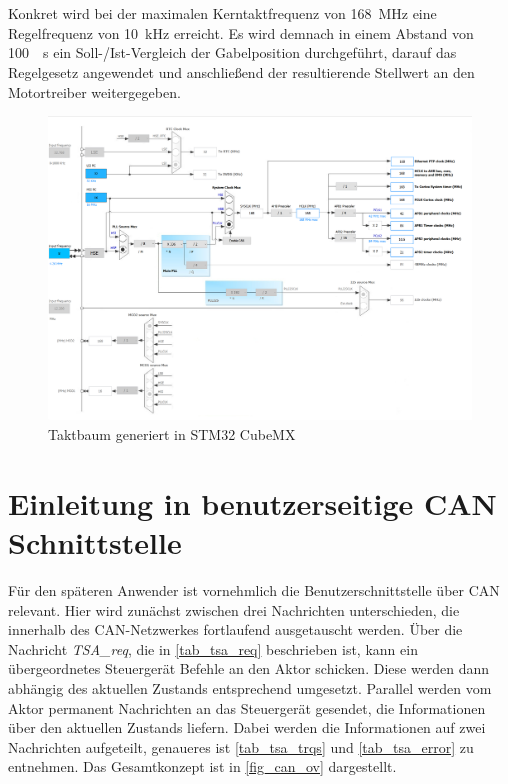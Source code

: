 \section{}
Konkret wird bei der maximalen Kerntaktfrequenz von \SI{168}{MHz} eine Regelfrequenz von \SI{10}{kHz} erreicht. Es wird demnach in einem Abstand von \SI{100}{\mu s} ein Soll-/Ist-Vergleich der Gabelposition durchgeführt, darauf das Regelgesetz angewendet und anschließend der resultierende Stellwert an den Motortreiber weitergegeben.

\begin{figure}%
\includegraphics[width=\columnwidth]{./Bilder/fig_clock}%
\caption{Taktbaum generiert in STM32 CubeMX}%
\label{fig_clock}%
\end{figure}

\section{Einleitung in benutzerseitige CAN Schnittstelle} \label{CANNachrichten}

Für den späteren Anwender ist vornehmlich die Benutzerschnittstelle über CAN relevant. Hier wird zunächst zwischen drei Nachrichten unterschieden, die innerhalb des CAN-Netzwerkes fortlaufend ausgetauscht werden. Über die Nachricht \textit{TSA\_req}, die in \autoref{tab_tsa_req} beschrieben ist, kann ein übergeordnetes Steuergerät Befehle an den Aktor schicken. Diese werden dann abhängig des aktuellen Zustands entsprechend umgesetzt. Parallel werden vom Aktor permanent Nachrichten an das Steuergerät gesendet, die Informationen über den aktuellen Zustands liefern. Dabei werden die Informationen auf zwei Nachrichten aufgeteilt, genaueres ist \autoref{tab_tsa_trqs} und \autoref{tab_tsa_error} zu entnehmen. Das Gesamtkonzept ist in \autoref{fig_can_ov} dargestellt.


